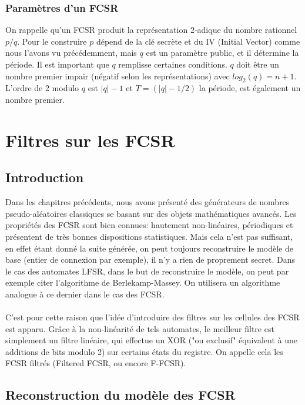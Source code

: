 \documentclass[11pt]{report}
\begin{document}
\subsection{Paramètres d'un FCSR}

On rappelle qu'un FCSR produit la représentation 2-adique du nombre rationnel $p/q$. Pour le construire $p$ dépend de la clé secrète et du IV (Initial Vector) comme nous l'avons vu précédemment, mais $q$ est un paramètre public, et il détermine la période. Il est important que $q$ remplisse certaines conditions. $q$ doit être un nombre premier impair (négatif selon les représentations) avec $log_2(q)=n+1$. L'ordre de 2 modulo $q$ est $|q| - 1$ et $T=(|q|-1/2)$ la période, est également un nombre premier. 


\chapter{Filtres sur les FCSR}

\section{Introduction}
	
	Dans les chapitres précédents, nous avons présenté des générateurs de nombres pseudo-aléatoires classiques se basant sur des objets mathématiques avancés. Les propriétés des FCSR sont bien connues: hautement non-linéaires, périodiques et présentent de très bonnes dispositions statistiques. Mais cela n'est pas suffisant, en effet étant donné la suite générée, on peut toujours reconstruire le modèle de base (entier de connexion par exemple), il n'y a rien de proprement secret.  Dans le cas des automates LFSR, dans le but de reconstruire le modèle, on peut par exemple citer l'algorithme de Berlekamp-Massey. On utilisera un algorithme analogue à ce dernier dans le cas des FCSR. 
	\\
	\\	
	C'est pour cette raison que l'idée d'introduire des filtres sur les cellules des FCSR est apparu. Grâce à la non-linéarité de tels automates, le meilleur filtre est simplement un filtre linéaire, qui effectue un XOR ("ou exclusif" équivalent à une additions de bits modulo 2) sur certains états du registre. On appelle cela les FCSR filtrés (Filtered FCSR, ou encore F-FCSR). 

\section{Reconstruction du modèle des FCSR}
\end{document}

